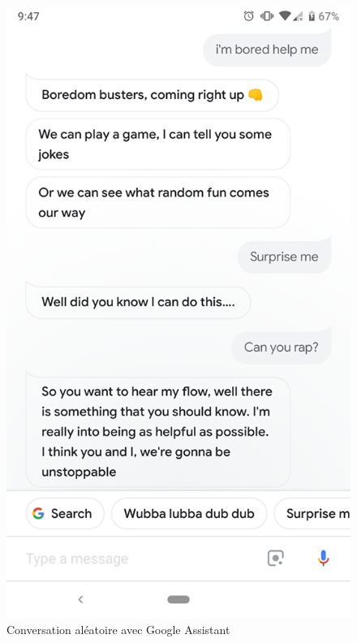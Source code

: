 \begin{figure}[h] 
	\captionsetup{justification=centering} 
	\begin{minipage}[b]{.45\textwidth}
		\centering
		\includegraphics[width=.85\linewidth]{images/google_assitant/bored.png} 
		\caption{Conversation aléatoire avec Google Assistant}
		\label{fig:boredpic}
		

\end{minipage}
\end{figure}
